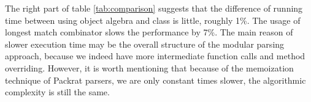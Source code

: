 
The right part of table \ref{tab:comparison} suggests that the difference of running time between
using object algebra and class is little, roughly 1\%.
The usage of longest match combinator slows the performance by 7\%. The main reason of slower
execution time may be the overall structure of the modular parsing approach, because we indeed have
more intermediate function calls and method overriding. However, it is worth mentioning that
because of the memoization technique of Packrat parsers, we are only constant times
slower, the algorithmic complexity is still the same.
